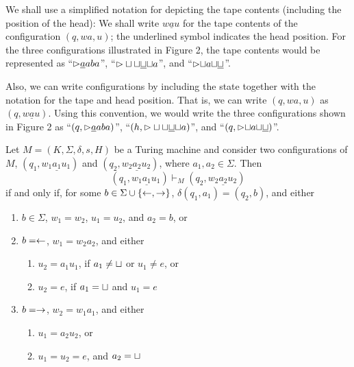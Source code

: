 We shall use a simplified notation for depicting the tape contents (including the position of the head): We shall write $w\underline{a}u$ for the tape contents of the configuration $(q, wa, u)$; the underlined symbol indicates the head position. For the three configurations illustrated in Figure 2, the tape contents would be represented as ``${\vartriangleright}\underline{a}aba$'', ``${\vartriangleright}\sqcup\sqcup\underline{\sqcup}{\sqcup}a$'', and ``${\vartriangleright}{\sqcup}a{\sqcup}\underline{\sqcup}$''.

\vspace*{\fill}
\columnbreak

Also, we can write configurations by including the state together with the notation for the tape and head position. That is, we can write $(q, wa, u)$ as $(q, w\underline{a}u)$. Using this convention, we would write the three configurations shown in Figure 2 as ``$(q, {\vartriangleright}\underline{a}aba)$'', ``$(h, {\vartriangleright}\sqcup\sqcup\underline{\sqcup}{\sqcup}a)$'', and ``$(q, {\vartriangleright}{\sqcup}a{\sqcup}\underline{\sqcup})$''.
\begin{definition}{}
Let $M = (K, \Sigma, \delta, s, H)$ be a Turing machine and consider two configurations of $M$, $(q_1, w_1\underline{a_1}u_1)$ and $(q_2, w_2\underline{a_2}u_2)$, where $a_1, a_2 \in \Sigma$. Then
\begin{equation*}
  (q_1, w_1\underline{a_1}u_1) \vdash_M (q_2, w_2\underline{a_2}u_2)
\end{equation*}
if and only if, for some $b \in \Sigma \cup \{\leftarrow, \rightarrow\}$, $\delta(q_1, a_1) = (q_2, b)$, and either
\begin{enumerate}
  \item $b \in \Sigma$, $w_1 = w_2$, $u_1 = u_2$, and $a_2 = b$, or
  \item $b = \leftarrow$, $w_1 = w_2a_2$, and either
    \begin{enumerate}
      \item $u_2 = a_1u_1$, if $a_1 \neq \sqcup$ or $u_1 \neq e$, or
      \item $u_2 = e$, if $a_1 = \sqcup$ and $u_1 = e$
    \end{enumerate}
  \item $b = \rightarrow$, $w_2 = w_1a_1$, and either
    \begin{enumerate}
      \item $u_1 = a_2u_2$, or 
      \item $u_1 = u_2 = e$, and $a_2 = \sqcup$
    \end{enumerate}
\end{enumerate}
\end{definition}
